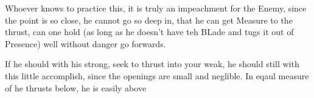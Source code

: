 Whoever knows to practice this, it is truly an impeachment for the
Enemy, since the point is so close, he cannot go so deep in, that he
can get Measure to the thrust, can one hold (as long as he doesn't
have teh BLade and tugs it out of Presence) well without danger go forwards.

If he should with his strong, seek to thrust into your weak, he should
still with this little accomplish, since the openings are small and
neglible. In eqaul measure of he thrusts below, he is easily above